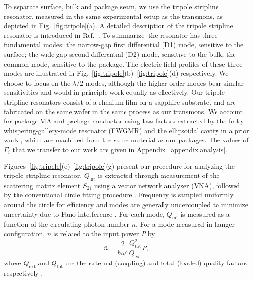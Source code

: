 \documentclass[
    reprint,
    superscriptaddress,
    amsmath,amssymb,
    aps,
    prb,
    floatfix,
]{revtex4-2}
\begin{document}
To separate surface, bulk and package seam, we use the tripole stripline resonator, measured in the same experimental setup as the transmons, as depicted in Fig.~\ref{fig:tripole}(a). A detailed description of the tripole stripline resonator is introduced in Ref.~\cite{ganjam2024}. To summarize, the resonator has three fundamental modes: the narrow-gap first differential (D1) mode, sensitive to the surface; the wide-gap second differential (D2) mode, sensitive to the bulk; the common mode, sensitive to the package. The electric field profiles of these three modes are illustrated in Fig.~\ref{fig:tripole}(b)--\ref{fig:tripole}(d) respectively. We choose to focus on the $\lambda/2$ modes, although the higher-order modes bear similar sensitivities and would in principle work equally as effectively. Our tripole stripline resonators consist of a rhenium film on a sapphire substrate, and are fabricated on the same wafer in the same process as our transmons. We account for package MA and package conductor using loss factors extracted by the forky whispering-gallery-mode resonator (FWGMR) and the ellipsoidal cavity in a prior work \cite{lei2023}, which are machined from the same material as our packages. The values of $\Gamma_i$ that we transfer to our work are given in Appendix~\ref{appendix:analysis}.

Figures~\ref{fig:tripole}(e)--\ref{fig:tripole}(g) present our procedure for analyzing the tripole stripline resonator. $Q_\mathrm{int}$ is extracted through measurement of the scattering matrix element $S_{21}$ using a vector network analyzer (VNA), followed by the conventional circle fitting procedure \cite{gao2008,khalil2012,probst2015}. Frequency is sampled uniformly around the circle for efficiency \cite{baity2024,ganjam2024} and modes are generally undercoupled to minimize uncertainty due to Fano interference \cite{rieger2023}. For each mode, $Q_\mathrm{int}$ is measured as a function of the circulating photon number $\bar{n}$. For a mode measured in hanger configuration, $\bar{n}$ is related to the input power $P$ by
\begin{equation}
    \bar{n}=\frac{2}{\hbar\omega^2}\frac{Q_\mathrm{tot}^2}{Q_\mathrm{ext}}P,
    \label{eq:nbar}
\end{equation}
where $Q_\mathrm{ext}$ and $Q_\mathrm{tot}$ are the external (coupling) and total (loaded) quality factors respectively \cite{ganjam2024}.
\end{document}
